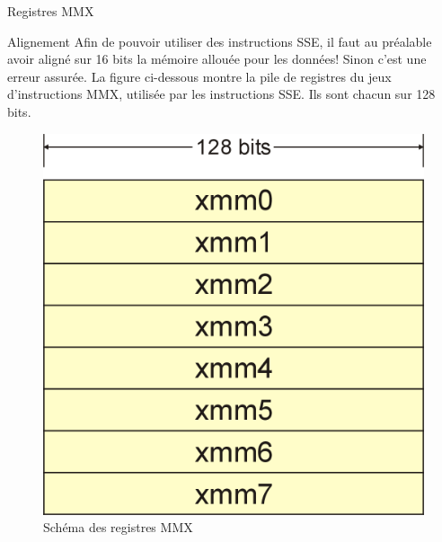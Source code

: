 \documentclass{beamer}
\begin{document}
\begin{frame}{Registres MMX}
    \begin{block}{Alignement}
    Afin de pouvoir utiliser des instructions SSE, il faut au préalable avoir
    aligné sur 16 bits la mémoire allouée pour les données! Sinon c'est une 
    erreur assurée.
\newline \newline
    La figure ci-dessous montre la pile de registres du jeux d'instructions MMX,
    utilisée par les instructions SSE. Ils sont chacun sur 128 bits.
    \end{block}

    \begin{figure}[!t]
    \begin{center}
        \includegraphics[scale=0.13]{XMM_registers.png}
    \end{center}
     \caption{Schéma des registres MMX}
    \end{figure}
\end{frame}
\end{document}
